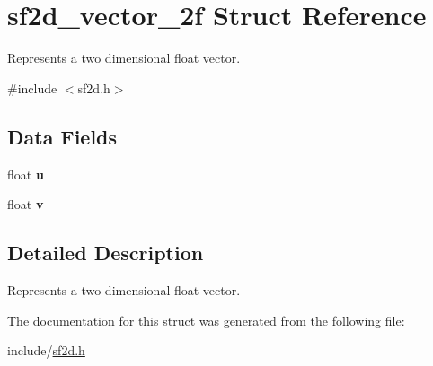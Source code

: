 \hypertarget{structsf2d__vector__2f}{\section{sf2d\-\_\-vector\-\_\-2f Struct Reference}
\label{structsf2d__vector__2f}
}


Represents a two dimensional float vector.  




{\ttfamily \#include $<$sf2d.\-h$>$}

\subsection*{Data Fields}
\begin{DoxyCompactItemize}
\item 
\hypertarget{structsf2d__vector__2f_aabe555907fa0cee95076998b0a23aed9}{float {\bfseries u}}\label{structsf2d__vector__2f_aabe555907fa0cee95076998b0a23aed9}

\item 
\hypertarget{structsf2d__vector__2f_ae9cab2d0f74baf57efbdbfdffa8492b9}{float {\bfseries v}}\label{structsf2d__vector__2f_ae9cab2d0f74baf57efbdbfdffa8492b9}

\end{DoxyCompactItemize}


\subsection{Detailed Description}
Represents a two dimensional float vector. 

The documentation for this struct was generated from the following file\-:\begin{DoxyCompactItemize}
\item 
include/\hyperlink{sf2d_8h}{sf2d.\-h}\end{DoxyCompactItemize}
